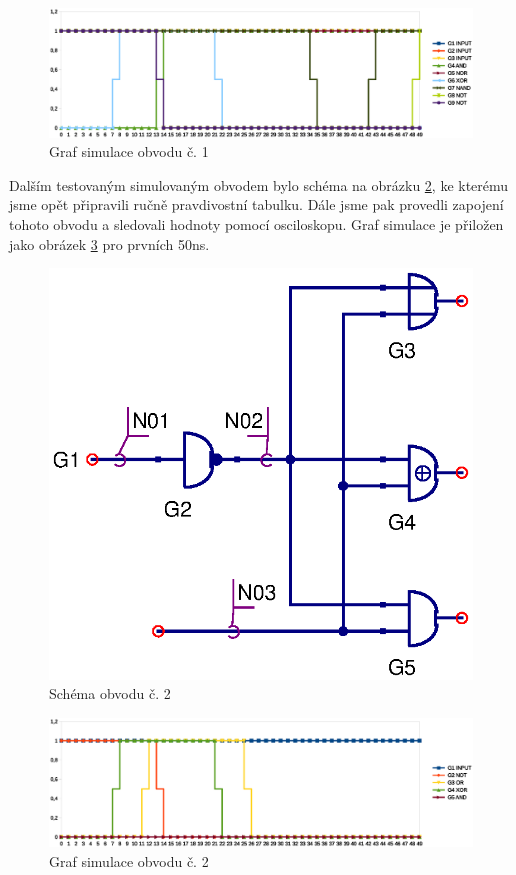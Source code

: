 \documentclass[11pt,a4paper]{article}
\begin{document}
			\begin{figure}[!htb]
				\centering
					\includegraphics[scale=.6]{graf1.eps}
					\caption{Graf simulace obvodu č. 1}
					\label{fig:graf1}
			\end{figure}

			Dalším testovaným simulovaným obvodem bylo schéma na obrázku \ref{fig:scheme2}, ke kterému jsme opět připravili ručně pravdivostní tabulku. Dále jsme pak provedli zapojení tohoto obvodu a sledovali hodnoty pomocí osciloskopu. Graf simulace je přiložen jako obrázek \ref{fig:graf2} pro prvních 50ns.

			\begin{figure}[!htb]
					\centering
						\includegraphics[scale=.5]{input2.eps}
						\caption{Schéma obvodu č. 2}
						\label{fig:scheme2}
			\end{figure}

			\begin{figure}[!htb]
				\centering
					\includegraphics[scale=.6]{graf2.eps}
					\caption{Graf simulace obvodu č. 2}
					\label{fig:graf2}
			\end{figure}
\end{document}
